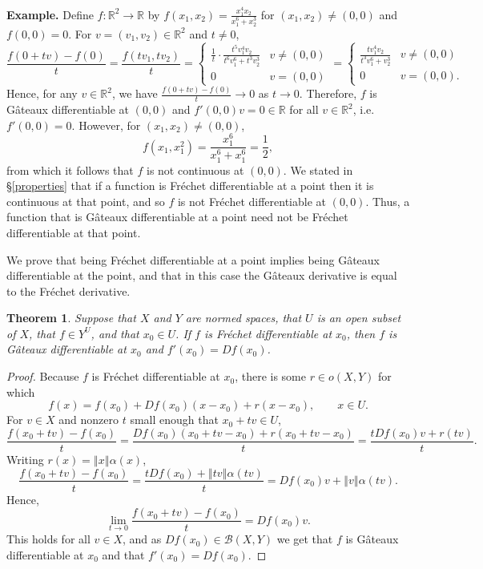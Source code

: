 \documentclass{article}
\newcommand{\norm}[1]{\left\Vert #1 \right\Vert}
\newtheorem{theorem}{Theorem}
\theoremstyle{definition}
\begin{document}
\textbf{Example.} Define $f:\mathbb{R}^2 \to \mathbb{R}$ by
$f(x_1,x_2)=\frac{x_1^4x_2}{x_1^6+x_2^3}$ for $(x_1,x_2) \neq (0,0)$ and
$f(0,0)=0$. For $v=(v_1,v_2) \in \mathbb{R}^2$ and $t \neq 0$,
\[
\frac{f(0+tv)-f(0)}{t}=\frac{f(tv_1,tv_2)}{t}=
\begin{cases}
\frac{1}{t} \cdot \frac{t^5v_1^4v_2}{t^6v_1^6+t^3v_2^3}&v \neq (0,0)\\
0&v=(0,0)
\end{cases}
=\begin{cases}
\frac{tv_1^4v_2}{t^3v_1^6+v_2^3}&v \neq (0,0)\\
0&v=(0,0).
\end{cases}
\]
Hence, for any $v \in \mathbb{R}^2$, we have $\frac{f(0+tv)-f(0)}{t} \to 0$ as $t \to 0$. Therefore, 
$f$ is G\^ateaux differentiable at $(0,0)$ and $f'(0,0)v = 0 \in \mathbb{R}$ for all $v \in \mathbb{R}^2$, i.e. $f'(0,0)=0$.
However, for $(x_1,x_2) \neq (0,0)$,
\[
f(x_1,x_1^2)=\frac{x_1^6}{x_1^6+x_1^6}=\frac{1}{2},
\]
from which it follows that $f$ is not continuous at $(0,0)$. We stated in \S \ref{properties} that if a function is Fr\'echet differentiable
at a point then it is continuous at that point, and so $f$ is not Fr\'echet differentiable at $(0,0)$. Thus, a function that is 
G\^ateaux differentiable at a point need not be Fr\'echet differentiable at that point.

We prove that being Fr\'echet differentiable at a point implies being G\^ateaux differentiable at the point, and that in this case the
G\^ateaux derivative is equal to the Fr\'echet derivative.

\begin{theorem}
Suppose that $X$ and $Y$ are normed spaces, that $U$ is an open subset of $X$, that $f \in Y^U$, and that
$x_0 \in U$. If $f$ is Fr\'echet differentiable at $x_0$, then $f$ is G\^ateaux differentiable at $x_0$ and $f'(x_0)=Df(x_0)$.
\end{theorem}
\begin{proof}
Because $f$ is Fr\'echet differentiable at $x_0$, there is some $r \in o(X,Y)$ for which 
\[
f(x)=f(x_0)+Df(x_0)(x-x_0)+r(x-x_0), \qquad x \in U.
\]
For $v \in X$ and nonzero $t$ small enough that $x_0+tv \in U$,
\[
\frac{f(x_0+tv)-f(x_0)}{t} = \frac{Df(x_0)(x_0+tv-x_0)+r(x_0+tv-x_0)}{t} = \frac{tDf(x_0)v+r(tv)}{t}.
\]
Writing $r(x)=\norm{x}\alpha(x)$,
\[
\frac{f(x_0+tv)-f(x_0)}{t}  = \frac{tDf(x_0)+\norm{tv}\alpha(tv)}{t}= Df(x_0)v + \norm{v}\alpha(tv).
\]
Hence, 
\[
\lim_{t \to 0} \frac{f(x_0+tv)-f(x_0)}{t} = Df(x_0)v.
\]
This holds for all $v \in X$, and as $Df(x_0) \in \mathscr{B}(X,Y)$ we get that $f$ is G\^ateaux differentiable at $x_0$ and that
$f'(x_0)=Df(x_0)$.
\end{proof}
\end{document}
